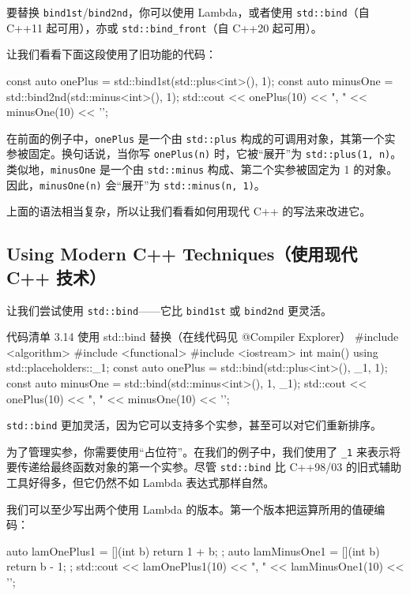 要替换 \texttt{bind1st}/\texttt{bind2nd}，你可以使用 Lambda，或者使用 \texttt{std::bind}（自 C++11 起可用），亦或 \texttt{std::bind\_front}（自 C++20 起可用）。

让我们看看下面这段使用了旧功能的代码：

\begin{codebox}
const auto onePlus = std::bind1st(std::plus<int>(), 1);
const auto minusOne = std::bind2nd(std::minus<int>(), 1);
std::cout << onePlus(10) << ", " << minusOne(10) << '\n';
\end{codebox}

在前面的例子中，\texttt{onePlus} 是一个由 \texttt{std::plus} 构成的可调用对象，其第一个实参被固定。换句话说，当你写 \texttt{onePlus(n)} 时，它被“展开”为 \texttt{std::plus(1, n)}。类似地，\texttt{minusOne} 是一个由 \texttt{std::minus} 构成、第二个实参被固定为 1 的对象。因此，\texttt{minusOne(n)} 会“展开”为 \texttt{std::minus(n, 1)}。

上面的语法相当复杂，所以让我们看看如何用现代 C++ 的写法来改进它。

\subsection{Using Modern C++ Techniques（使用现代 C++ 技术）}

让我们尝试使用 \texttt{std::bind}——它比 \texttt{bind1st} 或 \texttt{bind2nd} 更灵活。

\begin{codeboxt}{代码清单 3.14 使用 std::bind 替换（在线代码见 @Compiler Explorer）}
#include <algorithm>
#include <functional>
#include <iostream>
int main() {
using std::placeholders::_1;
const auto onePlus = std::bind(std::plus<int>(), _1, 1);
const auto minusOne = std::bind(std::minus<int>(), 1, _1);
std::cout << onePlus(10) << ", " << minusOne(10) << '\n';
}
\end{codeboxt}

\texttt{std::bind} 更加灵活，因为它可以支持多个实参，甚至可以对它们重新排序。

为了管理实参，你需要使用“占位符”。在我们的例子中，我们使用了 \texttt{\_1} 来表示将要传递给最终函数对象的第一个实参。尽管 \texttt{std::bind} 比 C++98/03 的旧式辅助工具好得多，但它仍然不如 Lambda 表达式那样自然。

我们可以至少写出两个使用 Lambda 的版本。第一个版本把运算所用的值硬编码：

\begin{codebox}
auto lamOnePlus1 = [](int b) { return 1 + b; };
auto lamMinusOne1 = [](int b) { return b - 1; };
std::cout << lamOnePlus1(10) << ", " << lamMinusOne1(10) << '\n';
\end{codebox}

